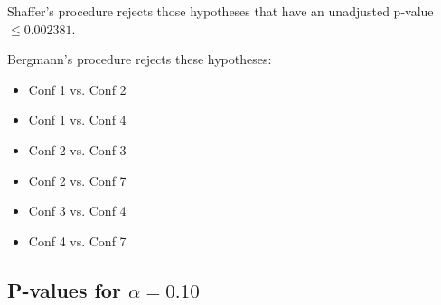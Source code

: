 \documentclass[a4paper,10pt]{article}
\begin{document}
\begin{landscape}
Shaffer's procedure rejects those hypotheses that have an unadjusted p-value $\le0.002381$.

Bergmann's procedure rejects these hypotheses:

\begin{itemize}

\item Conf 1 vs. Conf 2

\item Conf 1 vs. Conf 4

\item Conf 2 vs. Conf 3

\item Conf 2 vs. Conf 7

\item Conf 3 vs. Conf 4

\item Conf 4 vs. Conf 7

\end{itemize}

\pagebreak

\subsection{P-values for $\alpha=0.10$}


\end{landscape}
\end{document}
